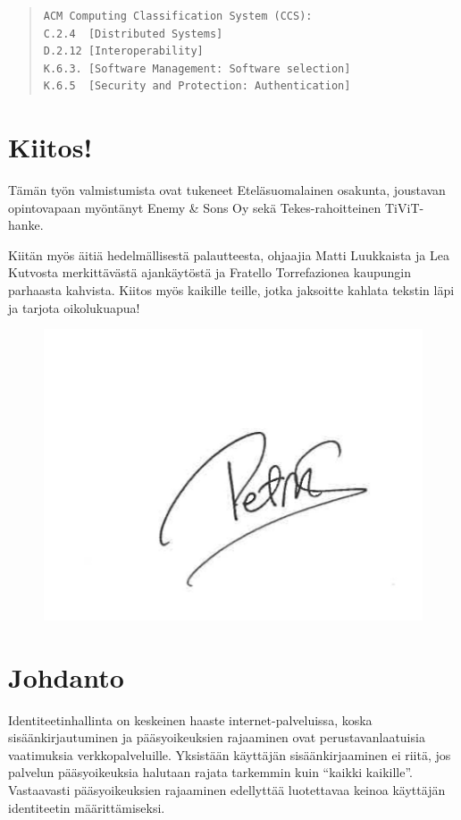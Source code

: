 \documentclass[finnish,gradu]{tktltiki}
\makeatletter
\newcommand{\gradutableofcontents}{%
  \tableofcontents
  \newpage
  \listoffigures

  \newpage
  \section*{Kiitos!}

  Tämän työn valmistumista ovat tukeneet Eteläsuomalainen osakunta, joustavan opintovapaan myöntänyt Enemy \& Sons Oy sekä Tekes-rahoitteinen TiViT-hanke.

  Kiitän myös äitiä hedelmällisestä palautteesta, ohjaajia Matti Luukkaista ja Lea Kutvosta merkittävästä ajankäytöstä ja Fratello Torrefazionea kaupungin parhaasta kahvista. Kiitos myös kaikille teille, jotka jaksoitte kahlata tekstin läpi ja tarjota oikolukuapua!

  \begin{figure}[hl!]
    \includegraphics{images/nimmari.jpg}
  \end{figure} \hfill


  \newpage
  \pagenumbering{arabic}
  \if@emptyfirstpagenumber
    \thispagestyle{empty}
  \fi

}
\makeatother
\begin{document}
\begin{abstract}





\begin{verbatim}
ACM Computing Classification System (CCS):
C.2.4  [Distributed Systems]
D.2.12 [Interoperability]
K.6.3. [Software Management: Software selection]
K.6.5  [Security and Protection: Authentication]
\end{verbatim}

\end{abstract}

\setcounter{tocdepth}{3}
\gradutableofcontents



\section{Johdanto} %
\label{sec:johdanto}

  Identiteetinhallinta on keskeinen haaste internet-palveluissa, koska sisäänkirjautuminen ja pääsyoikeuksien rajaaminen ovat perustavanlaatuisia vaatimuksia verkkopalveluille. Yksistään käyttäjän sisäänkirjaaminen ei riitä, jos palvelun pääsyoikeuksia halutaan rajata tarkemmin kuin ``kaikki kaikille''. Vastaavasti pääsyoikeuksien rajaaminen edellyttää luotettavaa keinoa käyttäjän identiteetin määrittämiseksi.
\end{document}
